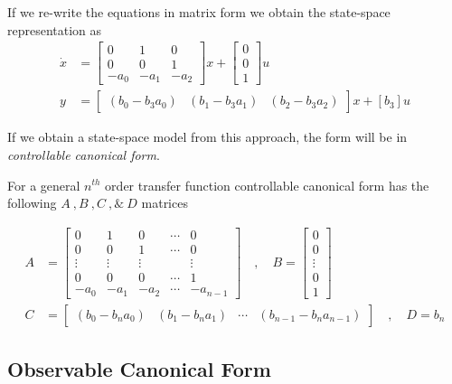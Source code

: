 \documentclass[twoside]{article}
\begin{document}
%
If we re-write the equations in matrix form we obtain the state-space representation as
%
\begin{align*}
	\dot{x} &= \left[ \begin{array}{ccc} 0 & 1 & 0  \\  0 & 0 & 1 \\  -a_0 & -a_1 & -a_2 \end{array} \right] x 
	+ \left[ \begin{array}{c} 0 \\ 0 \\ 1 \end{array} \right] u
	\\
	y &= \left[ \begin{array}{ccc} ( b_0 - b_3 a_0 ) & ( b_1 - b_3 a_1 )  & ( b_2 - b_3 a_2 ) \end{array} \right] x
	+ \left[ b_3 \right] u
\end{align*}

If we obtain a state-space model from this approach, the form
will be in \textit{controllable canonical form}. 

For a general $n^{th}$ order transfer function controllable
canonical form has the following $A \ ,  B \ ,  C \ , \& \ D$
matrices

\begin{align*}
A &= \left[ \begin{array}{ccccc} 0 & 1 & 0 & \cdots & 0 \\ 0 & 0 & 1 &
                                                                      \cdots & 0
\\ \vdots & \vdots & \vdots & & \vdots
\\ 0 & 0 & 0 & \cdots & 1
    \\ -a_0 & -a_1 & -a_2 & \cdots & -a_{n-1} \end{array} \right]
\quad , \quad 
B = \left[ \begin{array}{c} 0\\ 0 \\ \vdots \\ 0
    \\ 1 \end{array} \right]
\\ C &= \left[ \begin{array}{cccc} (b_0 - b_n a_0) 
  &  (b_1 - b_n a_1) & \cdots & (b_{n-1} - b_n a_{n-1}) \end{array} \right]
\quad , \quad
D = b_n
\end{align*}

\subsection{Observable Canonical Form}
\end{document}
